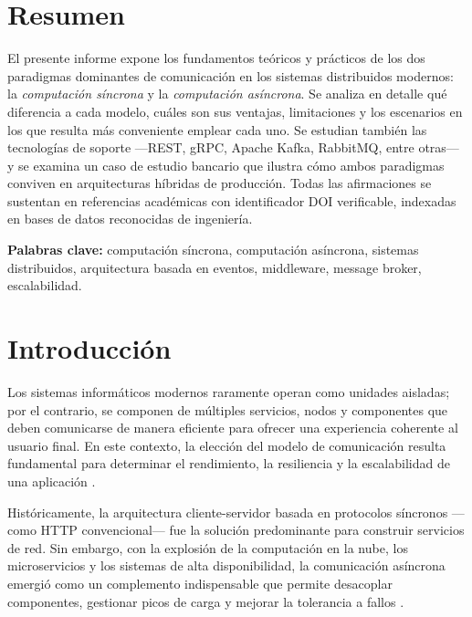 \documentclass[12pt,a4paper]{article}
\begin{document}
\section{Resumen}
 
El presente informe expone los fundamentos teóricos y prácticos de los dos paradigmas dominantes de comunicación en los sistemas distribuidos modernos: la \textit{computación síncrona} y la \textit{computación asíncrona}. Se analiza en detalle qué diferencia a cada modelo, cuáles son sus ventajas, limitaciones y los escenarios en los que resulta más conveniente emplear cada uno. Se estudian también las tecnologías de soporte —REST, gRPC, Apache Kafka, RabbitMQ, entre otras— y se examina un caso de estudio bancario que ilustra cómo ambos paradigmas conviven en arquitecturas híbridas de producción. Todas las afirmaciones se sustentan en referencias académicas con identificador DOI verificable, indexadas en bases de datos reconocidas de ingeniería.
 
\textbf{Palabras clave:} computación síncrona, computación asíncrona, sistemas distribuidos, arquitectura basada en eventos, middleware, message broker, escalabilidad.
 
\section{Introducción}
 
Los sistemas informáticos modernos raramente operan como unidades aisladas; por el contrario, se componen de múltiples servicios, nodos y componentes que deben comunicarse de manera eficiente para ofrecer una experiencia coherente al usuario final. En este contexto, la elección del modelo de comunicación resulta fundamental para determinar el rendimiento, la resiliencia y la escalabilidad de una aplicación \cite{ref1}.
 
Históricamente, la arquitectura cliente-servidor basada en protocolos síncronos —como HTTP convencional— fue la solución predominante para construir servicios de red. Sin embargo, con la explosión de la computación en la nube, los microservicios y los sistemas de alta disponibilidad, la comunicación asíncrona emergió como un complemento indispensable que permite desacoplar componentes, gestionar picos de carga y mejorar la tolerancia a fallos \cite{ref2}.
 
\end{document}
